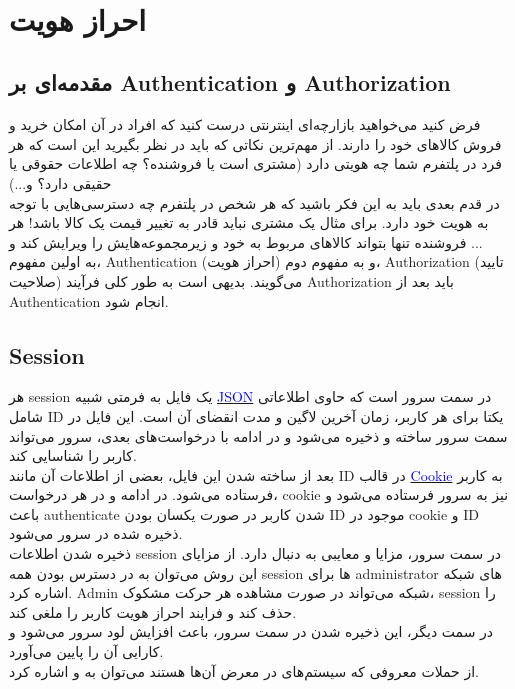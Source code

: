 \documentclass[]{article}
\newcommand{\link}[2]{\href{#1}{\textcolor{blue}{#2}}}
\begin{document}
\KashidaOff



\tableofcontents

\newpage

 \Large \textbf{\\
}


\section*{{\titr احراز هویت}}
\subsection*{{\titr مقدمه‌ای بر Authentication و Authorization}}
فرض کنید می‌خواهید بازارچه‌ای اینترنتی درست کنید که افراد در آن امکان خرید و فروش کالاهای خود را دارند. از مهم‌ترین نکاتی که باید در نظر بگیرید این است که هر فرد در پلتفرم شما چه هویتی دارد (مشتری است یا فروشنده؟ چه اطلاعات حقوقی یا حقیقی دارد؟ و...)\\
در قدم بعدی باید به این فکر باشید که هر شخص در پلتفرم چه دسترسی‌هایی با توجه به هویت خود دارد. برای مثال یک مشتری نباید قادر به تغییر قیمت یک کالا باشد! هر فروشنده تنها بتواند کالاهای مربوط به خود و زیرمجموعه‌هایش را ویرایش کند و ...\\
به اولین مفهوم، Authentication (احراز هویت) و به مفهوم دوم، Authorization (تایید صلاحیت) می‌گویند. بدیهی است به طور کلی فرآیند Authorization باید بعد از Authentication انجام شود.

\subsection*{{\titr Session}}
هر session یک فایل به فرمتی شبیه \link{https://www.json.org/json-en.html}{JSON} در سمت سرور است که حاوی اطلاعاتی شامل ID یکتا برای هر کاربر، زمان آخرین لاگین و مدت انقضای آن است. این فایل در سمت سرور ساخته و ذخیره می‌شود و در ادامه با درخواست‌های بعدی، سرور می‌تواند کاربر را شناسایی کند.\\
 بعد از ساخته شدن این فایل، بعضی از اطلاعات آن مانند ID در قالب \link{https://en.wikipedia.org/wiki/HTTP_cookie}{Cookie} به کاربر فرستاده می‌شود. در ادامه و در هر درخواست، cookie نیز به سرور فرستاده می‌شود و باعث authenticate شدن کاربر در صورت یکسان بودن ID موجود در cookie و ID ذخیره شده در سرور می‌شود.\\
ذخیره شدن اطلاعات session در سمت سرور، مزایا و معایبی به دنبال دارد. از مزایای این روش می‌توان به در دسترس بودن همه session ها برای administrator های شبکه اشاره کرد. Admin شبکه می‌تواند در صورت مشاهده هر حرکت مشکوک، session را حذف کند و فرایند احراز هویت کاربر را ملغی کند.\\
در سمت دیگر، این ذخیره شدن در سمت سرور، باعث افزایش لود سرور می‌شود و کارایی آن را پایین می‌آورد.\\
از حملات معروفی که سیستم‌های  در معرض آن‌ها هستند می‌توان به \link{https://en.wikipedia.org/wiki/Cross-site_request_forgery}{\lr{Cross-site request forgery}} و \link{https://en.wikipedia.org/wiki/Man-in-the-middle_attack}{\lr{Man-in-the-middle}} اشاره کرد.
\end{document}
